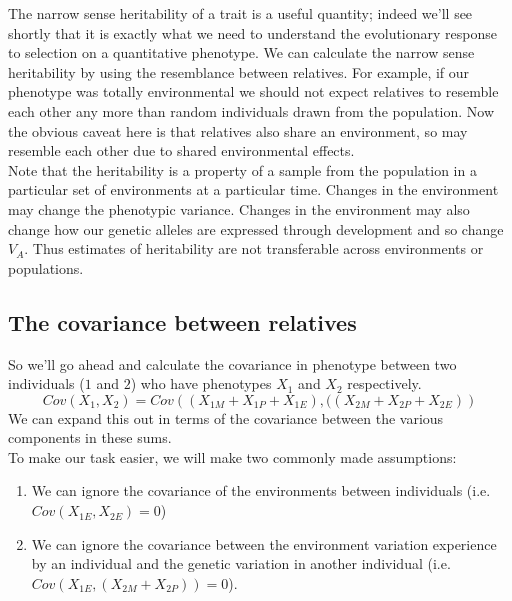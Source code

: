 The narrow sense heritability of a trait is a useful quantity; indeed
we'll see shortly that it is exactly what we need to understand the
evolutionary response to selection on a quantitative phenotype. We can
calculate the narrow sense heritability by using the resemblance between
relatives. For example, if our phenotype was totally environmental  we
should not expect relatives to resemble each other any more than random
individuals drawn from the population. Now the obvious caveat here is
that relatives also share an environment, so may resemble each other
due to shared environmental effects. \\

Note that the heritability is a property of a sample from the population in a particular set of environments at a particular time. Changes in the environment may change the phenotypic variance. Changes in the environment may also change how our genetic alleles are expressed through development and so change $V_A$. Thus estimates of heritability are not transferable across environments or populations. 

\subsection{The covariance between relatives}
So we'll go ahead and calculate the covariance in phenotype between two individuals
($1$ and $2$) who have phenotypes $X_1$ and $X_2$ respectively.
\begin{equation}
Cov(X_1,X_2) =
Cov\left((X_{1M}+X_{1P}+X_{1E}),((X_{2M}+X_{2P}+X_{2E}) \right)
\end{equation}
We can expand this out in terms of the covariance between the various
components in these sums.\\

To make our task easier, we will make two commonly made assumptions:
\begin{enumerate}
\item We can ignore the covariance of the environments
between individuals (i.e. $Cov(X_{1E},X_{2E})=0$)
\item We can ignore the covariance
between the environment variation  experience by an individual and the
genetic variation in another individual (i.e. $Cov(X_{1E},(X_{2M}+X_{2P}))=0$).
\end{enumerate}

